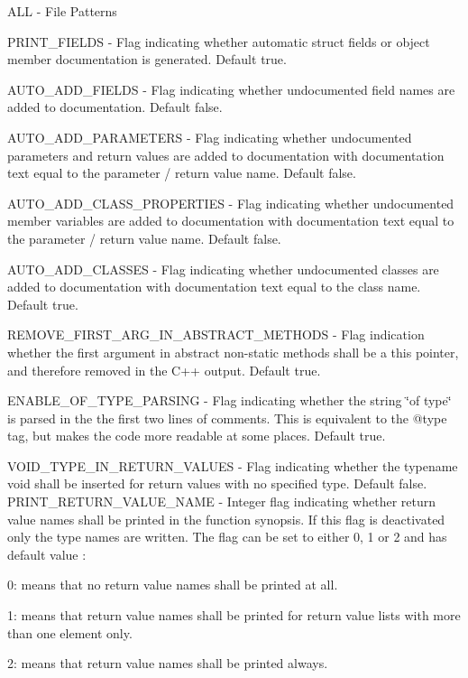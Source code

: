 \begin{DoxyItemize}
\item {\ttfamily A\+L\+L} -\/ File Patterns
\item {\ttfamily P\+R\+I\+N\+T\+\_\+\+F\+I\+E\+L\+D\+S} -\/ Flag indicating whether automatic struct fields or object member documentation is generated. Default {\ttfamily true}.
\item {\ttfamily A\+U\+T\+O\+\_\+\+A\+D\+D\+\_\+\+F\+I\+E\+L\+D\+S} -\/ Flag indicating whether undocumented field names are added to documentation. Default {\ttfamily false}.
\item {\ttfamily A\+U\+T\+O\+\_\+\+A\+D\+D\+\_\+\+P\+A\+R\+A\+M\+E\+T\+E\+R\+S} -\/ Flag indicating whether undocumented parameters and return values are added to documentation with documentation text equal to the parameter / return value name. Default false.
\item {\ttfamily A\+U\+T\+O\+\_\+\+A\+D\+D\+\_\+\+C\+L\+A\+S\+S\+\_\+\+P\+R\+O\+P\+E\+R\+T\+I\+E\+S} -\/ Flag indicating whether undocumented member variables are added to documentation with documentation text equal to the parameter / return value name. Default false.
\item A\+U\+T\+O\+\_\+\+A\+D\+D\+\_\+\+C\+L\+A\+S\+S\+E\+S -\/ Flag indicating whether undocumented classes are added to documentation with documentation text equal to the class name. Default {\ttfamily true}.
\item R\+E\+M\+O\+V\+E\+\_\+\+F\+I\+R\+S\+T\+\_\+\+A\+R\+G\+\_\+\+I\+N\+\_\+\+A\+B\+S\+T\+R\+A\+C\+T\+\_\+\+M\+E\+T\+H\+O\+D\+S -\/ Flag indication whether the first argument in abstract non-\/static methods shall be a this pointer, and therefore removed in the C++ output. Default {\ttfamily true}.
\item E\+N\+A\+B\+L\+E\+\_\+\+O\+F\+\_\+\+T\+Y\+P\+E\+\_\+\+P\+A\+R\+S\+I\+N\+G -\/ Flag indicating whether the string \char`\"{}of type\char`\"{} is parsed in the the first two lines of comments. This is equivalent to the @type tag, but makes the code more readable at some places. Default {\ttfamily true}.
\item V\+O\+I\+D\+\_\+\+T\+Y\+P\+E\+\_\+\+I\+N\+\_\+\+R\+E\+T\+U\+R\+N\+\_\+\+V\+A\+L\+U\+E\+S -\/ Flag indicating whether the typename void shall be inserted for return values with no specified type. Default {\ttfamily false}. P\+R\+I\+N\+T\+\_\+\+R\+E\+T\+U\+R\+N\+\_\+\+V\+A\+L\+U\+E\+\_\+\+N\+A\+M\+E -\/ Integer flag indicating whether return value names shall be printed in the function synopsis. If this flag is deactivated only the type names are written. The flag can be set to either 0, 1 or 2 and has default value {}\+:
\begin{DoxyItemize}
\item 0\+: means that no return value names shall be printed at all.
\item 1\+: means that return value names shall be printed for return value lists with more than one element only.
\item 2\+: means that return value names shall be printed always.
\end{DoxyItemize}
\end{DoxyItemize}

